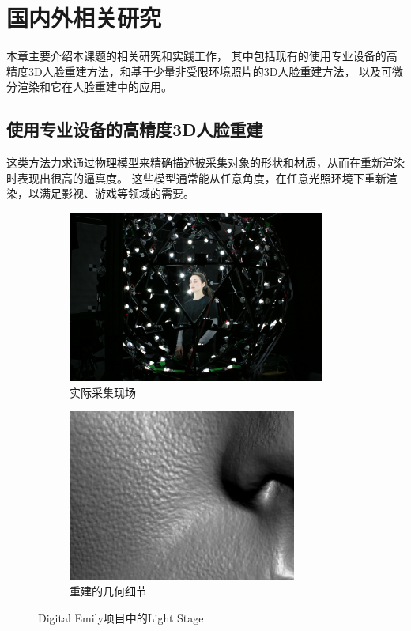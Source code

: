 \chapter{国内外相关研究}
\label{chap:related_work}

本章主要介绍本课题的相关研究和实践工作，
其中包括现有的使用专业设备的高精度3D人脸重建方法，和基于少量非受限环境照片的3D人脸重建方法，
以及可微分渲染和它在人脸重建中的应用。

\section{使用专业设备的高精度3D人脸重建}

这类方法力求通过物理模型来精确描述被采集对象的形状和材质，从而在重新渲染时表现出很高的逼真度。
这些模型通常能从任意角度，在任意光照环境下重新渲染，以满足影视、游戏等领域的需要。

\begin{figure}
\centering
\begin{subfigure}[b]{0.53\textwidth}
    \centering
    \includegraphics[height=160pt]{figures/light_stage}
    \caption{实际采集现场}
\end{subfigure}%
\begin{subfigure}[b]{0.47\textwidth}
    \centering
    \includegraphics[height=160pt]{figures/emily_detail_1}
    \caption{重建的几何细节}
\end{subfigure}
\caption[Digital Emily 项目中的 Light Stage]{Digital Emily项目中的Light Stage\cite{DEP}}
\end{figure}


